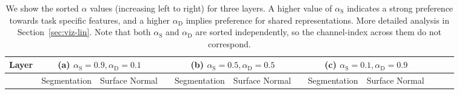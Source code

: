 \documentclass[10pt,twocolumn,letterpaper]{article}
\begin{document}
\begin{table*}
\setlength{\tabcolsep}{0.1em}
\centering
\caption{We show the sorted $\alpha$ values (increasing left to right) for three layers. A higher value of $\alpha_\mathrm{S}$ indicates a strong preference towards task specific features, and a higher $\alpha_\mathrm{D}$ implies preference for shared representations. More detailed analysis in Section~\ref{sec:viz-lin}. Note that both $\alpha_\mathrm{S}$ and $\alpha_\mathrm{D}$ are sorted independently, so the channel-index across them do not correspond.}
\label{tbl:lr-init-viz}
\hspace*{-0.1in}
\begin{tabular}{@{}cccccccccccc@{}}
\toprule
Layer & \multicolumn{2}{c}{(a) $\alpha_{\mathrm{S}}=0.9, \alpha_{\mathrm{D}}=0.1$} & & \multicolumn{2}{c}{(b) $\alpha_{\mathrm{S}}=0.5, \alpha_{\mathrm{D}}=0.5$} & & \multicolumn{2}{c}{(c) $\alpha_{\mathrm{S}}=0.1, \alpha_{\mathrm{D}}=0.9$} \\
\midrule
& \hspace{0.1in} Segmentation & \hspace{0.1in} Surface Normal &  & \hspace{0.1in} Segmentation & \hspace{0.1in} Surface Normal & & \hspace{0.1in} Segmentation & \hspace{0.1in} Surface Normal \\


\end{tabular}
\end{table*}
\end{document}
